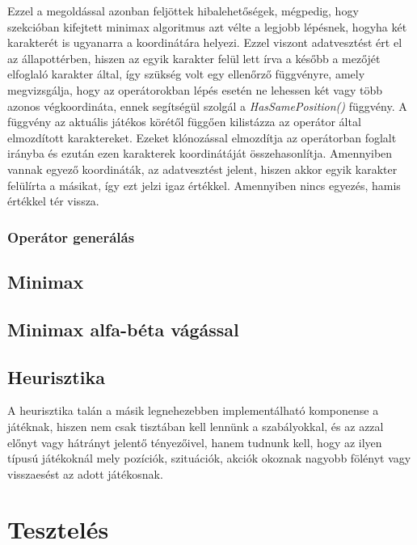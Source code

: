\documentclass[
]{thesis-ekf}
\theoremstyle{definition}
\theoremstyle{remark}
\begin{document}
Ezzel a megoldással azonban feljöttek hibalehetőségek, mégpedig, hogy  szekcióban kifejtett minimax algoritmus azt vélte a legjobb lépésnek, hogyha két karakterét is ugyanarra a koordinátára helyezi. Ezzel viszont adatvesztést ért el az állapottérben, hiszen az egyik karakter felül lett írva a később a mezőjét elfoglaló karakter által, így szükség volt egy ellenőrző függvényre, amely megvizsgálja, hogy az operátorokban lépés esetén ne lehessen két vagy több azonos végkoordináta, ennek segítségül szolgál a \emph{HasSamePosition()} függvény. A függvény az aktuális játékos körétől függően kilistázza az operátor által elmozdított karaktereket. Ezeket klónozással elmozdítja az operátorban foglalt irányba és ezután ezen karakterek koordinátáját összehasonlítja. Amennyiben vannak egyező koordináták, az adatvesztést jelent, hiszen akkor egyik karakter felülírta a másikat, így ezt jelzi igaz értékkel. Amennyiben nincs egyezés, hamis értékkel tér vissza.

\subsection{Operátor generálás} \label{operatorgen}

\section{Minimax} \label{minimax}

\section{Minimax alfa-béta vágással} \label{minimaxalphabeta}

\section{Heurisztika} \label{heuristics}

A heurisztika talán a másik legnehezebben implementálható komponense a játéknak, hiszen nem csak tisztában kell lennünk a szabályokkal, és az azzal előnyt vagy hátrányt jelentő tényezőivel, hanem tudnunk kell, hogy az ilyen típusú játékoknál mely pozíciók, szituációk, akciók okoznak nagyobb fölényt vagy visszaesést az adott játékosnak. 

\chapter{Tesztelés}
\end{document}
